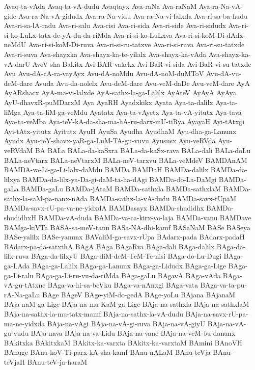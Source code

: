 {Avaq-ta-vAda
Avaq-ta-vA-dudu
Avaqtayx
Ava-raNa
Ava-raNaM
Ava-ra-Na-vA-gide
Ava-ra-Na-vA-gidudx
Ava-ra-Na-vidu
Ava-ra-Na-vi-lalxda
Ava-ri-sa-ba-hudu
Ava-ri-sa-lA-radu
Ava-ri-salu
Ava-risi
Ava-ri-sida
Ava-ri-side
Ava-ri-sidudx
Ava-ri-si-ko-LuLx-tatx-de-yA-du-da-riMda
Ava-ri-si-ko-LuLxva
Ava-ri-si-koM-Di-dAdx-neMdU
Ava-ri-si-koM-Di-ruva
Ava-ri-si-ru-tatxve
Ava-ri-si-ruva
Ava-ri-su-tatxde
Ava-ri-suva
Ava-shayxka
Ava-shayx-ka-te-yilalx
Ava-shayx-ka-vAda
Ava-shayx-ka-vA-darU
AveV-sha-Bakitx
Avi-BAR-vakekx
Avi-BaR-vi-sida
Avi-BaR-vi-su-tatxde
Avu
Avu-dA-cA-ra-vayAyx
Avu-dA-noMdu
Avu-dA-noM-duMToV
Avu-dA-vu-deM-dare
Avuda
Avu-da-nolelx
Avu-deM-dare
Avu-veM-daDe
Avu-veM-dare
AyA
AyARshacx
AyA-ma-vi-lalxde
AyA-sathx-la-ga-Lalilx
AyAteV
AyAyA
AyAya
AyU-dhavxR-puMDarxM
Aya
AyaRH
Ayadxkikx
Ayata
Aya-ta-dalilx
Aya-ta-liMga
Aya-ta-liM-ga-veMdu
Ayatatx
Aya-ta-vAyetx
Aya-ta-vA-yitutx
Aya-tava
Aya-ta-veMba
Aya-teV-kA-da-sha-ma-hA-ru-darx-mU-tiRya
AyayaH
Ayi-tAtxgi
Ayi-tAtx-yitutx
Ayitutx
AyuH
AyuSa
Ayudha
AyudhaM
Ayu-dha-ga-Lanunx
Ayudx
Ayu-reY-shavx-yaR-ga-LuM-TA-gu-vuvu
Ayususx
Ayu-veRVda
Ayu-veRVdaM
BA
BALa
BALa-da-kaSxra
BALa-da-kaSx-rava
BALa-dali
BALa-doLu
BALa-neVtarx
BALa-neVtarxM
BALa-neV-tarxvu
BALa-veMdeV
BAMDAnAM
BAMDA-va-Li-ga-Li-lalx-daMdu
BAMDa
BAMDaH
BAMDa-dalilx
BAMDa-da-lilxya
BAMDa-da-lilx-ya-Da-gi-daM-ta-ha-dAgi
BAMDa-do-La-DaMgi
BAMDa-gaLa
BAMDa-gaLu
BAMDa-jAtaM
BAMDa-sathxla
BAMDa-sathxlaM
BAMDa-sathx-la-saM-pa-nanx-nAda
BAMDa-sathx-la-vA-dudu
BAMDa-savx-rUpaM
BAMDa-savx-rU-pa-va-ne-yidxdA
BAMDasayx
BAMDa-shudidhx
BAMDa-shudidhxH
BAMDa-vA-duda
BAMDa-va-ca-kirx-yo-laja
BAMDa-vanu
BAMDave
BAMga-kiVTa
BASA-sa-meV-tanu
BASa-NA-dhi-kamf
BASaNaM
BASe
BASeya
BASe-yalilx
BASe-yanunx
BAValiM-ga-savx-rUpa
BAdarx-pada
BAdarx-padaH
BAdarx-pa-da-satxthA
BAgA
BAga
BAgaRva
BAga-dali
BAga-dalilx
BAga-da-lilx-ruva
BAga-da-lilxyU
BAga-diM-deM-TeM-Te-nisi
BAga-do-Lu-Dugi
BAga-ga-LAda
BAga-ga-Lalilx
BAga-ga-Lanunx
BAga-ga-Lidudx
BAga-ga-Lige
BAga-ga-Li-ralu
BAga-ga-Li-ru-vu-da-riMda
BAga-gaLu
BAgavA
BAga-vAda
BAga-vA-gu-tAtxne
BAga-va-hi-sa-beVku
BAga-va-nAnxgi
BAga-vata
BAga-va-ta-pu-rA-Na-gaLu
BAge
BAgeV
BAge-yiM-do-gedA
BAge-yoLu
BAjana
BAjanaM
BAja-naM-ga-Lige
BAja-na-mu-KaM-ga-Lige
BAja-na-sathxla
BAja-na-sathxlaM
BAja-na-sathx-la-mu-tatx-mamf
BAja-na-sathx-la-vA-dudu
BAja-na-savx-rU-pa-ma-ne-yidxda
BAja-na-vAgi
BAja-na-vA-gi-ruva
BAja-na-vA-giyU
BAja-na-vA-gu-vudu
BAja-nava
BAja-na-va-Lidu
BAja-na-vane
BAja-na-veM-bu-danunx
BAkitxka
BAkitxkaM
BAkitx-ka-varxta
BAkitx-ka-varxtaM
BAmini
BAnoVH
BAnuge
BAnu-koV-Ti-parx-kA-sha-kamf
BAnu-nALaM
BAnu-teVja
BAnu-teVjaH
BAnu-teV-ja-haraM
}
